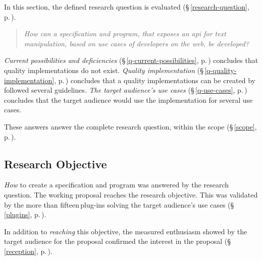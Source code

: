 In this section, the defined research question is evaluated
  (§\,\ref{research-question}, p.\,\pageref{research-question}).

\begin{quote}
  \textit{How can a specification and program, that exposes an \acrshort{api}
    for text manipulation, based on use cases of developers on the web,
    be developed?
  }
\end{quote}

\noindent\emph{Current possibilities and deficiencies}
  (§\,\ref{q-current-possibilities}, p.\,\pageref{q-current-possibilities})
  concludes that quality implementations do not exist.
\emph{Quality implementation} (§\,\ref{q-quality-implementation},
  p.\,\pageref{q-quality-implementation}) concludes that a quality
  implementations can be created by followed several guidelines.
\emph{The target audience's use cases} (§\,\ref{q-use-cases},
  p.\,\pageref{q-use-cases}) concludes that the target audience would use the
  implementation for several use cases.

These answers answer the complete research question, within the scope
  (§\,\ref{scope}, p.\,\pageref{scope}).

\subsection{Research Objective}\label{q-research-objective}

\emph{How} to create a specification and program was answered by the research
  question.
The working proposal reaches the research objective.
This was validated by the more than fifteen\,plug-ins solving the target
  audience's use cases (§\,\ref{plugins}, p.\,\pageref{plugins}).

In addition to \emph{reaching} this objective, the measured enthusiasm
  showed by the target audience for the proposal confirmed the interest in
  the proposal (§\,\ref{reception}, p.\,\pageref{reception}).
